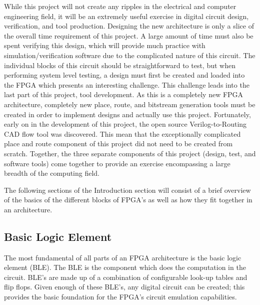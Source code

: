 \documentclass[12pt]{article}
\begin{document}
While this project will not create any ripples in the electrical and computer engineering 
field, it will be an extremely useful exercise in digital circuit design, verification,
and tool production. Designing the new architecture is only a slice of the overall 
time requirement of this project. A large amount of time must also be spent verifying 
this design, which will provide much practice with simulation/verification software 
due to the complicated nature of this circuit. The individual blocks of this circuit 
should be straightforward to test, but when performing system level testing, a design 
must first be created and loaded into the FPGA which presents an interesting challenge.
This challenge leads into the last part of this project, tool development. As this 
is a completely new FPGA architecture, completely new place, route, and bitstream generation tools must 
be created in order to implement designs and actually use this project. Fortunately,
early on in the development of this project, the open source Verilog-to-Routing \cite{vtr} CAD flow
tool was discovered. This mean that the exceptionally complicated place and route component
of this project did not need to be created from scratch. Together, the three separate
components of this project (design, test, and software tools) come together to provide an
exercise encompassing a large breadth of the computing field.

The following sections of the Introduction section will consist of a brief overview
of the basics of the different blocks of FPGA's as well as how they fit together in
an architecture.

\subsection{Basic Logic Element} \label{sec:intro_ble}

The most fundamental of all parts of an FPGA architecture is the basic logic element 
(BLE). The BLE is the component which does the computation in the circuit.
BLE’s are made up of a combination of configurable look-up tables and flip flops. Given enough 
of these BLE’s, any digital circuit can be created; this provides the 
basic foundation for the FPGA’s circuit emulation capabilities.
\end{document}
